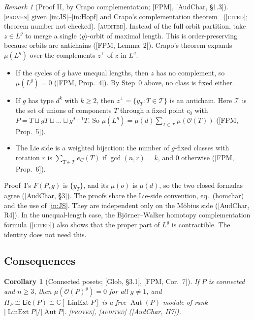 \documentclass[11pt]{article}
\newtheorem{corollary}[theorem]{Corollary}
\theoremstyle{definition}
\theoremstyle{remark}
\newtheorem{remark}[theorem]{Remark}
\newcommand{\OP}{\mathcal O}
\newcommand{\Lin}{\operatorname{LinExt}}
\newcommand{\Aut}{\operatorname{Aut}}
\newcommand{\PLie}{\mathsf{Lie}}
\newcommand{\st}[1]{\textup{[\textsc{#1}]}}
\begin{document}
\begin{remark}[Proof II, by Crapo complementation; {[FPM]}, {[AudChar, \S1.3]}]
\label{rem:proofII}
\st{proven} given \ref{in:JS}--\ref{in:Hopf} and Crapo's complementation
theorem~\cite{Crapo} (\st{cited}; theorem number not checked). \st{audited}.
Instead of the full orbit partition, take $z\in L^g$ to merge a single
$\langle g\rangle$-orbit of maximal length. This is order-preserving because
orbits are antichains ([FPM, Lemma~2]). Crapo's theorem expands
$\mu(L^g)$ over the complements $z^\perp$ of $z$ in $L^g$.
\begin{itemize}[nosep]
\item If the cycles of $g$ have unequal lengths, then $z$ has no complement,
  so $\mu(L^g)=0$ ([FPM, Prop.~4]). By Step~0 above, no class is fixed
  either.
\item If $g$ has type $d^k$ with $k\ge2$, then $z^\perp=\{y_T:T\in\mathcal T\}$
  is an antichain. Here $\mathcal T$ is the set of unions of components $T$
  through a fixed point $c_0$ with $P=T\sqcup gT\sqcup\dots\sqcup g^{d-1}T$.
  So $\mu(L^g)=\mu(d)\sum_{T\in\mathcal T}\mu(\OP(T))$ ([FPM, Prop.~5]).
\item The Lie side is a weighted bijection: the number of $g$-fixed classes
  with rotation $r$ is $\sum_{T\in\mathcal T}e_C(T)$ if $\gcd(n,r)=k$, and
  $0$ otherwise ([FPM, Prop.~6]).
\end{itemize}
Proof~I's $F(P,g)$ is $\{y_T\}$, and its $\mu(o)$ is $\mu(d)$, so the two
closed formulas agree ([AudChar, \S3]). The proofs share the Lie-side
convention, eq.~(homchar) and the use of \ref{in:JS}. They are independent
only on the M\"obius side ([AudChar, R4]). In the unequal-length case, the
Bj\"orner--Walker homotopy complementation formula (\st{cited}) also shows
that the proper part of $L^g$ is contractible. The identity does not need
this.
\end{remark}

\subsection{Consequences}

\begin{corollary}[Connected posets; {[Glob, \S3.1]}, {[FPM, Cor.~7]}]
\label{cor:connected}
If $P$ is connected and $n\ge3$, then $\mu(\OP(P)^g)=0$ for all $g\ne1$, and
$H_P\cong\PLie(P)\cong\mathbb C[\Lin P]$ is a free $\Aut(P)$-module of rank
$|\Lin P|/|\Aut P|$. \st{proven}, \st{audited} ([AudChar, II7]).
\end{corollary}
\end{document}
